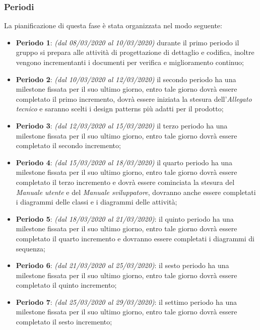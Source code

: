 \subsubsection{Periodi}
La pianificazione di questa fase è stata organizzata nel modo seguente:
\begin{itemize}
\item \textbf{Periodo 1}: \textit{(dal 08/03/2020 al 10/03/2020)} durante il primo periodo il gruppo si prepara alle attività di progettazione di dettaglio e codifica, inoltre vengono incrementanti i documenti per verifica e miglioramento continuo;

\item \textbf{Periodo 2}: \textit{(dal 10/03/2020 al 12/03/2020)} il secondo periodo ha una milestone fissata per il suo ultimo giorno, entro tale giorno dovrà essere completato il primo incremento, dovrà essere iniziata la stesura dell'\textit{Allegato tecnico} e saranno scelti i design patterns più adatti per il prodotto;

\item \textbf{Periodo 3}: \textit{(dal 12/03/2020 al 15/03/2020)} il terzo periodo ha una milestone fissata per il suo ultimo giorno, entro tale giorno dovrà essere completato il secondo incremento;

\item \textbf{Periodo 4}: \textit{(dal 15/03/2020 al 18/03/2020)} il quarto periodo ha una milestone fissata per il suo ultimo giorno, entro tale giorno dovrà essere completato il terzo incremento e dovrà essere cominciata la stesura del \textit{Manuale utente} e del \textit{Manuale sviluppatore}, dovranno anche essere completati i diagrammi delle classi e i diagrammi delle attività;

\item \textbf{Periodo 5}: \textit{(dal 18/03/2020 al 21/03/2020)}: il quinto periodo ha una milestone fissata per il suo ultimo giorno, entro tale giorno dovrà essere completato il quarto incremento e dovranno essere completati i diagrammi di sequenza;

\item \textbf{Periodo 6}: \textit{(dal 21/03/2020 al 25/03/2020)}: il sesto periodo ha una milestone fissata per il suo ultimo giorno, entro tale giorno dovrà essere completato il quinto incremento;

\item \textbf{Periodo 7}: \textit{(dal 25/03/2020 al 29/03/2020)}: il settimo periodo ha una milestone fissata per il suo ultimo giorno, entro tale giorno dovrà essere completato il sesto incremento;


\end{itemize}
